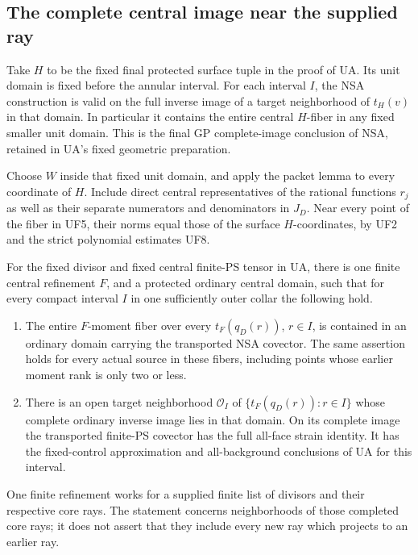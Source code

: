 \subsection{The complete central image near the supplied ray}

Take \(H\) to be the fixed final protected surface
tuple in the proof of UA.  Its unit domain is fixed
before the annular interval.  For each interval
\(I\), the NSA construction is valid on the full
inverse image of a target neighborhood of
\(t_H(v)\) in that domain.  In particular it
contains the entire central \(H\)-fiber in any
fixed smaller unit domain.  This is the final
GP complete-image conclusion of NSA, retained
in UA's fixed geometric preparation.

Choose \(W\) inside that fixed unit domain,
and apply the packet lemma to every coordinate
of \(H\).  Include direct central representatives
of the rational functions \(r_j\) as well as
their separate numerators and denominators in
\(J_D\).  Near every point of the fiber in
UF5, their norms equal those of the surface
\(H\)-coordinates, by UF2 and the strict
polynomial estimates UF8.

\begin{theorem}
\label{thm:r13-completed-ray-fiber-localization}
For the fixed divisor and fixed central finite-PS
tensor in UA, there is one finite central
refinement \(F\), and a protected ordinary
central domain, such that for every compact
interval \(I\) in one sufficiently outer
collar the following hold.
\begin{enumerate}
\item The entire \(F\)-moment fiber over every
\(t_F(q_D(r))\), \(r\in I\), is contained
in an ordinary domain carrying the transported
NSA covector.  The same assertion holds for
every actual source in these fibers, including
points whose earlier moment rank is only two
or less.
\item There is an open target neighborhood
\(\mathcal O_I\) of
\(\{t_F(q_D(r)):r\in I\}\) whose complete
ordinary inverse image lies in that domain.
On its complete image the transported finite-PS
covector has the full all-face strain identity.
It has the fixed-control approximation and
all-background conclusions of UA for this
interval.
\end{enumerate}
One finite refinement works for a supplied
finite list of divisors and their respective
core rays.  The statement concerns neighborhoods
of those completed core rays; it does not
assert that they include every new ray which
projects to an earlier ray.
\end{theorem}

